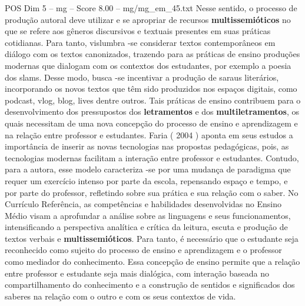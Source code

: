 \begin{textsample}{POS Dim 5 – mg – Score 8.00 – mg/mg\_em\_45.txt}
Nesse sentido, o processo de produção autoral deve utilizar e se apropriar de recursos \textbf{multissemióticos} no que se refere aos gêneros discursivos e textuais presentes em suas práticas cotidianas.
Para tanto, vislumbra -se considerar textos contemporâneos em diálogo com os textos canonizados, trazendo para as práticas de ensino produções modernas que dialogam com os contextos dos estudantes, por exemplo a poesia dos slams.
Desse modo, busca -se incentivar a produção de saraus literários, incorporando os novos textos que têm sido produzidos nos espaços digitais, como podcast, vlog, blog, lives dentre outros.
Tais práticas de ensino contribuem para o desenvolvimento dos pressupostos dos \textbf{letramentos} e dos \textbf{multiletramentos}, os quais necessitam de uma nova concepção do processo de ensino e aprendizagem e na relação entre professor e estudantes.
Faria ( 2004 ) aponta em seus estudos a importância de inserir as novas tecnologias nas propostas pedagógicas, pois, as tecnologias modernas facilitam a interação entre professor e estudantes.
Contudo, para a autora, esse modelo caracteriza -se por uma mudança de paradigma que requer um exercício intenso por parte da escola, repensando espaço e tempo, e por parte do professor, refletindo sobre sua prática e sua relação com o saber.
No Currículo Referência, as competências e habilidades desenvolvidas no Ensino Médio visam a aprofundar a análise sobre as linguagens e seus funcionamentos, intensificando a perspectiva analítica e crítica da leitura, escuta e produção de textos verbais e \textbf{multissemióticos}.
Para tanto, é necessário que o estudante seja reconhecido como sujeito do processo de ensino e aprendizagem e o professor como mediador do conhecimento.
Essa concepção de ensino permite que a relação entre professor e estudante seja mais dialógica, com interação baseada no compartilhamento do conhecimento e a construção de sentidos e significados dos saberes na relação com o outro e com os seus contextos de vida.

\end{textsample}
